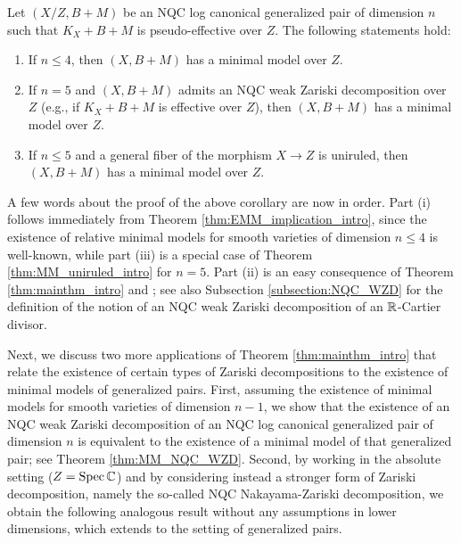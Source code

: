 	
	\begin{corA}[= Corollaries \ref{cor:maincor_I} and \ref{cor:maincor_II}]
		\label{cor:maincor_intro}
		Let $ (X/Z,B+M) $ be an NQC log canonical generalized pair of dimension $ n $ such that $ K_X+B+M$ is pseudo-effective over $ Z $. The following statements hold:
		\begin{enumerate}[\normalfont (i)]
			\item If $n \leq 4$, then $ (X,B+M) $ has a minimal model over $Z$.
			
			\item If $ n = 5 $ and $ (X,B+M) $ admits an NQC weak Zariski decomposition over $ Z $ (e.g., if $ K_X+B+M $ is effective over $ Z $), then $ (X,B+M) $ has a minimal model over $Z$.
			
			\item If $n \leq 5$ and a general fiber of the morphism $ X\to Z $ is uniruled, then $ (X,B+M) $ has a minimal model over $Z$.
		\end{enumerate}
	\end{corA}
	
	A few words about the proof of the above corollary are now in order. Part (i) follows immediately from Theorem \ref{thm:EMM_implication_intro}, since the existence of relative minimal models for smooth varieties of dimension $ n \leq 4 $ is well-known, while part (iii) is a special case of Theorem \ref{thm:MM_uniruled_intro} for $n=5$. Part (ii) is an easy consequence of Theorem \ref{thm:mainthm_intro} and \cite[Theorem 4.4(i)]{LT22a}; see also Subsection \ref{subsection:NQC_WZD} for the definition of the notion of an NQC weak Zariski decomposition of an $\mathbb{R}$-Cartier divisor.
	
	\medskip
	
	Next, we discuss two more applications of Theorem \ref{thm:mainthm_intro} that relate the existence of certain types of Zariski decompositions to the existence of minimal models of generalized pairs. First, assuming the existence of minimal models for smooth varieties of dimension $n-1$, we show that the existence of an NQC weak Zariski decomposition of an NQC log canonical generalized pair of dimension $n$ is equivalent to the existence of a minimal model of that generalized pair; see Theorem \ref{thm:MM_NQC_WZD}. Second, by working in the absolute setting ($ Z = \operatorname{Spec} \mathbb{C} $) and by considering instead a stronger form of Zariski decomposition, namely the so-called NQC Nakayama-Zariski decomposition, we obtain the following analogous result without any assumptions in lower dimensions, which extends \cite[Theorem 1.1]{BH14b} to the setting of generalized pairs.
	
